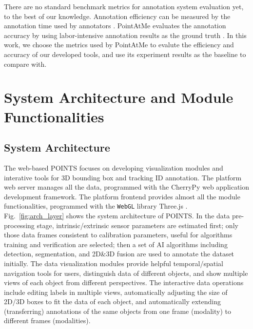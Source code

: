 \documentclass[letterpaper, 10 pt, conference]{ieeeconf}  %
\begin{document}
There are no standard benchmark metrics for annotation system evaluation yet, to the best of our knowledge.
Annotation efficiency can be measured by the annotation time used by annotators \cite{monica2017multi,pointatme,Zimmer20193DBA}. 
PointAtMe evaluates the annotation accuracy by using labor-intensive annotation results as the ground truth \cite{pointatme}. 
In this work, we choose the metrics used by PointAtMe \cite{pointatme} to evalute the efficiency and accuracy of our developed tools, 
and use its experiment results as the baseline to compare with.


\section{System Architecture and Module Functionalities}
\label{sec:systemarch}

\subsection{System Architecture}

The web-based POINTS focuses on developing visualization modules and interative tools for 3D bounding box and tracking ID annotation.
The platform web server manages all the data, programmed with the CherryPy \cite{cherrypy} web application development framework.
The platform frontend provides almost all the module functionalities, programmed with the \texttt{WebGL} library Three.js \cite{threejs}.
Fig.~\ref{fig:arch_layer} shows the system architecture of POINTS.
In the data pre-processing stage, intrinsic/extrinsic sensor parameters are estimated first; only those data frames consistent to calibration parameters, useful for algorithms training and verification are selected; then a set of AI algorithms including detection, segmentation, and 2D\&3D fusion are used to annotate the dataset initially. The data visualization modules provide helpful temporal/spatial navigation tools for users, distinguish data of different objects, and show multiple views of each object from different perspectives. The interactive data operations include editing labels in multiple views, automatically adjusting the size of 2D/3D boxes to fit the data of each object, and automatically extending (transferring) annotations of the same objects from one frame (modality) to different frames (modalities).
\end{document}
